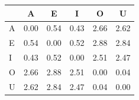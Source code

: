 \begin{tabular}{lccccc}
\toprule
\rowcolor{col01}
 & A & E & I & O & U \\
\midrule
A & 0.00 & 0.54 & 0.43 & 2.66 & 2.62 \\
E & 0.54 & 0.00 & 0.52 & 2.88 & 2.84 \\
I & 0.43 & 0.52 & 0.00 & 2.51 & 2.47 \\
O & 2.66 & 2.88 & 2.51 & 0.00 & 0.04 \\
U & 2.62 & 2.84 & 2.47 & 0.04 & 0.00 \\
\bottomrule
\end{tabular}

